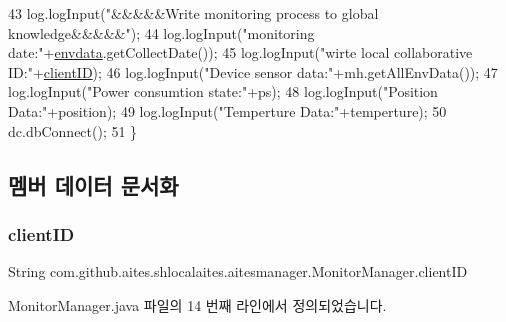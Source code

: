 \begin{DoxyCode}
43         log.logInput(\textcolor{stringliteral}{"&&&&&Write monitoring process to global knowledge&&&&&"});
44         log.logInput(\textcolor{stringliteral}{"monitoring date:"}+\mbox{\hyperlink{classcom_1_1github_1_1aites_1_1shlocalaites_1_1aitesmanager_1_1_monitor_manager_a47e3f99e310e396924a7f0fbef1478cb}{envdata}}.getCollectDate());
45         log.logInput(\textcolor{stringliteral}{"wirte local collaborative ID:"}+\mbox{\hyperlink{classcom_1_1github_1_1aites_1_1shlocalaites_1_1aitesmanager_1_1_monitor_manager_ac2cb1a60aa97ac0801f4241fb6ac0b14}{clientID}});
46         log.logInput(\textcolor{stringliteral}{"Device sensor data:"}+mh.getAllEnvData());
47         log.logInput(\textcolor{stringliteral}{"Power consumtion state:"}+ps);
48         log.logInput(\textcolor{stringliteral}{"Position Data:"}+position);
49         log.logInput(\textcolor{stringliteral}{"Temperture Data:"}+temperture);
50         dc.dbConnect();
51     \}
\end{DoxyCode}


\subsection{멤버 데이터 문서화}
\mbox{\label{classcom_1_1github_1_1aites_1_1shlocalaites_1_1aitesmanager_1_1_monitor_manager_ac2cb1a60aa97ac0801f4241fb6ac0b14}} 
\subsubsection{\texorpdfstring{client\+ID}{clientID}}
{\footnotesize\ttfamily String com.\+github.\+aites.\+shlocalaites.\+aitesmanager.\+Monitor\+Manager.\+client\+ID\hspace{0.3cm}{\ttfamily [private]}}



Monitor\+Manager.\+java 파일의 14 번째 라인에서 정의되었습니다.

\mbox{\label{classcom_1_1github_1_1aites_1_1shlocalaites_1_1aitesmanager_1_1_monitor_manager_a47e3f99e310e396924a7f0fbef1478cb}} 
